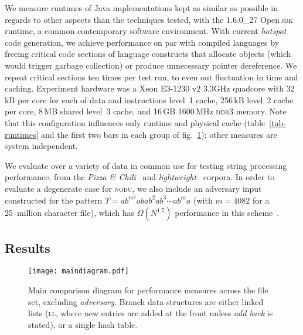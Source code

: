 \documentclass{llncs}
\newcommand\nobu{\textsc{nobu}\xspace}
\newcommand\lili{\textsc{ll}\xspace}
\begin{document}
We measure runtimes of Java implementations kept as similar as possible in
regards to other aspects than the techniques tested, with the 1.6.0\_27
Open\,\textsc{jdk} runtime,  a common contemporary software environment. With current
\emph{hotspot} code generation, we achieve performance on par with compiled
languages by freeing critical code sections of language constructs that allocate
objects (which would trigger garbage collection) or produce unnecessary pointer
dereference. We repeat critical sections ten times per test run, to
even out fluctuation in time and caching. Experiment hardware was a Xeon
E3-1230 v2 3.3GHz quadcore with 32\,kB per core for each of data and
instructions level~1 cache, 256\,kB level~2 cache per core, 8\,MB shared level~3
cache, and 16\,GB 1600\,MHz \textsc{ddr}3 memory. Note that this configuration
influences only runtime and physical cache (table~\ref{tab-runtimes} and the
first two bars in each group of fig.~\ref{fig-maidiagram}); other measures are
system independent.

We evaluate over a variety of data in common use for testing string processing
performance, from the \emph{Pizza \& Chili}~\cite{PizzaChiliCorpus} and
\emph{lightweight}~\cite{LightweightCorpus} corpora. In order to evaluate a
degenerate case for \nobu, we also include an adversary input constructed for
the pattern $T=ab^{m^2}abab^2ab^3\cdots ab^ma$ (with $m=4082$ for a 25~million
character file), which has $\Omega(N^{1.5})$ performance in this
scheme~\cite{SenftBranching}.


\subsection{Results}\label{sec-results}

\begin{figure}[t]
\begin{center}
\texttt{[image: maindiagram.pdf]}
\end{center}
\caption{\label{fig-maidiagram} Main comparison diagram for performance
  measures across the file set, excluding \emph{adversary}.  Branch
  data structures are either linked lists (\lili, where new entries are added
  at the front unless \emph{add back} is stated), or a single hash table.}
\vspace{1mm}
\end{figure}
\end{document}

